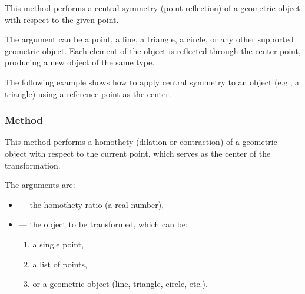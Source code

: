This method performs a central symmetry (point reflection) of a geometric object with respect to the given point.

\medskip
\noindent
The argument  can be a point, a line, a triangle, a circle, or any other supported geometric object. Each element of the object is reflected through the center point, producing a new object of the same type.

\medskip
\noindent
The following example shows how to apply central symmetry to an object (e.g., a triangle) using a reference point as the center.

\vspace{1em}



\begin{tkzexample}[latex=7cm]
\begin{center}
\end{center}
\end{tkzexample}

\subsubsection{Method }
\label{ssub:method_point_homothety_k_obj}

This method performs a homothety (dilation or contraction) of a geometric object with respect to the current point, which serves as the center of the transformation.

\medskip
\noindent
The arguments are:
\begin{itemize}
  \item {} — the homothety ratio (a real number),
  \item {} — the object to be transformed, which can be:
  \begin{enumerate}
    \item a single point,
    \item a list of points,
    \item or a geometric object (line, triangle, circle, etc.).
  \end{enumerate}
\end{itemize}

